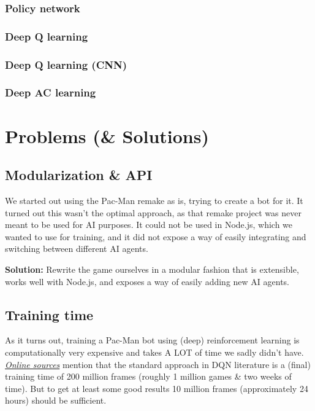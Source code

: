 \documentclass[10pt, letterpaper]{article}
\begin{document}
            \subsubsection*{Policy network}
            \subsubsection*{Deep Q learning}
            \subsubsection*{Deep Q learning (CNN)}
            \subsubsection*{Deep AC learning}
        
    \section{Problems (\& Solutions)}
        \subsection*{Modularization \& API}
            We started out using the Pac-Man remake as is, trying to create a bot for it. It turned out this wasn't the optimal approach, as that remake project was never meant to be used for AI purposes. It could not be used in Node.js, which we wanted to use for training, and it did not expose a way of easily integrating and switching between different AI agents.
            
            \vspace{1em}\noindent
            \textbf{Solution:} Rewrite the game ourselves in a modular fashion that is extensible, works well with Node.js, and exposes a way of easily adding new AI agents.
            
        \subsection*{Training time}
            As it turns out, training a Pac-Man bot using (deep) reinforcement learning is computationally very expensive and takes A LOT of time we sadly didn't have. \emph{\href{https://towardsdatascience.com/advanced-dqns-playing-pac-man-with-deep-reinforcement-learning-3ffbd99e0814}{Online sources}} mention that the standard approach in DQN literature is a (final) training time of 200 million frames (roughly 1 million games \& two weeks of time). But to get at least some good results 10 million frames (approximately 24 hours) should be sufficient.
            
\end{document}
